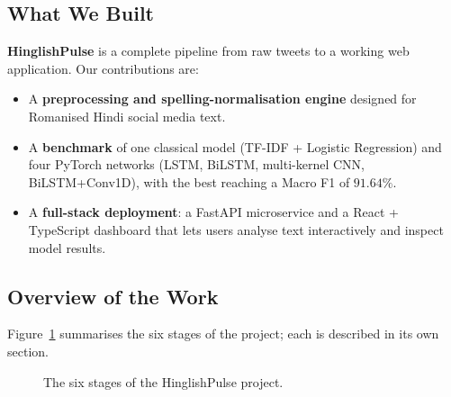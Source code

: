 \documentclass[11pt,a4paper]{article}
\begin{document}
\subsection{What We Built}
\textbf{HinglishPulse} is a complete pipeline from raw tweets to a working web application. Our contributions are:
\begin{itemize}
    \item A \textbf{preprocessing and spelling-normalisation engine} designed for Romanised Hindi social media text.
    \item A \textbf{benchmark} of one classical model (TF-IDF + Logistic Regression) and four PyTorch networks (LSTM, BiLSTM, multi-kernel CNN, BiLSTM+Conv1D), with the best reaching a Macro F1 of $91.64\%$.
    \item A \textbf{full-stack deployment}: a FastAPI microservice and a React + TypeScript dashboard that lets users analyse text interactively and inspect model results.
\end{itemize}

\subsection{Overview of the Work}
Figure~\ref{fig:overview} summarises the six stages of the project; each is described in its own section.

\begin{figure}[htbp]
\centering
{}
\caption{The six stages of the HinglishPulse project.}
\label{fig:overview}
\end{figure}
\end{document}
